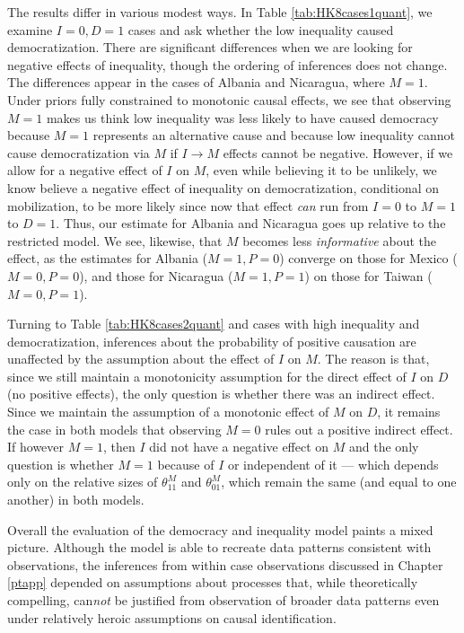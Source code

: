 \documentclass[
  12pt,
]{book}
\begin{document}
The results differ in various modest ways. In Table \ref{tab:HK8cases1quant}, we examine \(I=0, D=1\) cases and ask whether the low inequality caused democratization. There are significant differences when we are looking for negative effects of inequality, though the ordering of inferences does not change. The differences appear in the cases of Albania and Nicaragua, where \(M=1\). Under priors fully constrained to monotonic causal effects, we see that observing \(M=1\) makes us think low inequality was less likely to have caused democracy because \(M=1\) represents an alternative cause and because low inequality cannot cause democratization via \(M\) if \(I \rightarrow M\) effects cannot be negative. However, if we allow for a negative effect of \(I\) on \(M\), even while believing it to be unlikely, we know believe a negative effect of inequality on democratization, conditional on mobilization, to be more likely since now that effect \emph{can} run from \(I=0\) to \(M=1\) to \(D=1\). Thus, our estimate for Albania and Nicaragua goes up relative to the restricted model. We see, likewise, that \(M\) becomes less \emph{informative} about the effect, as the estimates for Albania (\(M=1, P=0\)) converge on those for Mexico (\(M=0, P=0\)), and those for Nicaragua (\(M=1, P=1\)) on those for Taiwan (\(M=0, P=1\)).

Turning to Table \ref{tab:HK8cases2quant} and cases with high inequality and democratization, inferences about the probability of positive causation are unaffected by the assumption about the effect of \(I\) on \(M\). The reason is that, since we still maintain a monotonicity assumption for the direct effect of \(I\) on \(D\) (no positive effects), the only question is whether there was an indirect effect. Since we maintain the assumption of a monotonic effect of \(M\) on \(D\), it remains the case in both models that observing \(M=0\) rules out a positive indirect effect. If however \(M=1\), then \(I\) did not have a negative effect on \(M\) and the only question is whether \(M=1\) because of \(I\) or independent of it --- which depends only on the relative sizes of \(\theta^M_{11}\) and \(\theta^M_{01}\), which remain the same (and equal to one another) in both models.

Overall the evaluation of the democracy and inequality model paints a mixed picture. Although the model is able to recreate data patterns consistent with observations, the inferences from within case observations discussed in Chapter \ref{ptapp} depended on assumptions about processes that, while theoretically compelling, can\emph{not} be justified from observation of broader data patterns even under relatively heroic assumptions on causal identification.
\end{document}

